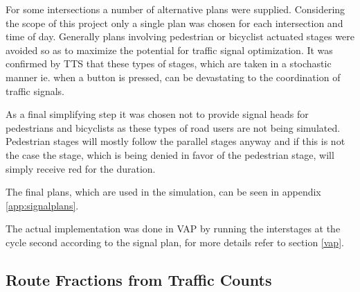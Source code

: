 For some intersections a number of alternative plans were supplied. Considering the scope of this project only a single plan was chosen for each intersection and time of day. Generally plans involving pedestrian or bicyclist actuated stages were avoided so as to maximize the potential for traffic signal optimization. It was confirmed by TTS that these types of stages, which are taken in a stochastic manner ie. when a button is pressed, can be devastating to the coordination of traffic signals.

As a final simplifying step it was chosen not to provide signal heads for pedestrians and bicyclists as these types of road users are not being simulated. Pedestrian stages will mostly follow the parallel stages anyway and if this is not the case the stage, which is being denied in favor of the pedestrian stage, will simply receive red for the duration.

The final plans, which are used in the simulation, can be seen in appendix \ref{app:signalplans}.

The actual implementation was done in VAP by running the interstages at the cycle second according to the signal plan, for more details refer to section \ref{vap}.

\subsection{Route Fractions from Traffic Counts}
\label{routefractions}
